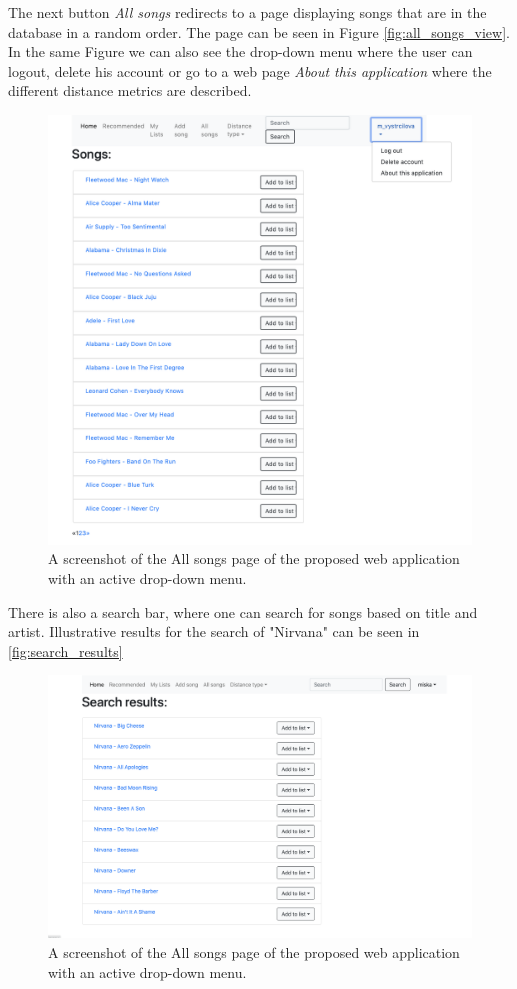 The next button \textit{All songs} redirects to a page displaying songs that are in the database in a random order. The page can be seen in Figure \ref{fig:all_songs_view}. In the same Figure we can also see the drop-down menu where the user can logout, delete his account or go to a web page \textit{About this application} where the different distance metrics are described.
\begin{figure}[H]
    \centering
	\includegraphics[width=1\linewidth]{./img/all_songs_page.png}
	\caption{A screenshot of the All songs page of the proposed web application with an active drop-down menu.}
	\label{fig:all_songs_page}
\end{figure}
There is also a search bar, where one can search for songs based on title and artist. Illustrative results for the search of "Nirvana" can be seen in \ref{fig:search_results} \\
\begin{figure}[H]
    \centering
	\includegraphics[width=1\linewidth]{./img/search_results_page.png}
	\caption{A screenshot of the All songs page of the proposed web application with an active drop-down menu.}
	\label{fig:search_results_page}
\end{figure}

